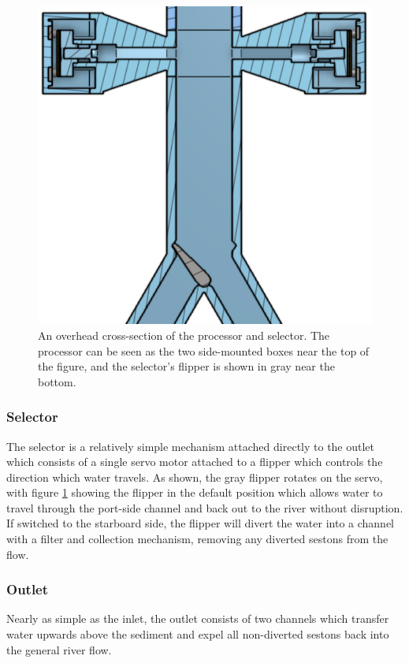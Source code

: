 \documentclass[fleqn,10pt]{SelfArx} %
\begin{document}
	\begin{figure}[h]
		\centering
		\includegraphics[width=1\linewidth]{Figures/OverheadCrosssection}
		\caption[Selector Cross-section]{An overhead cross-section of the processor and selector. The processor can be seen as the two side-mounted boxes near the top of the figure, and the selector's flipper is shown in gray near the bottom.}
		\label{fig:OverheadCrosssec}
	\end{figure}
	
	\subsubsection{Selector}
	The selector is a relatively simple mechanism attached directly to the outlet which consists of a single servo motor attached to a flipper which controls the direction which water travels. As shown, the gray flipper rotates on the servo, with figure \ref{fig:OverheadCrosssec} showing the flipper in the default position which allows water to travel through the port-side channel and back out to the river without disruption. If switched to the starboard side, the flipper will divert the water into a channel with a filter and collection mechanism, removing any diverted \glspl{seston} from the flow.
	
	\subsubsection{Outlet}
	Nearly as simple as the inlet, the outlet consists of two channels which transfer water upwards above the sediment and expel all non-diverted \glspl{seston} back into the general river flow.
	
\end{document}
